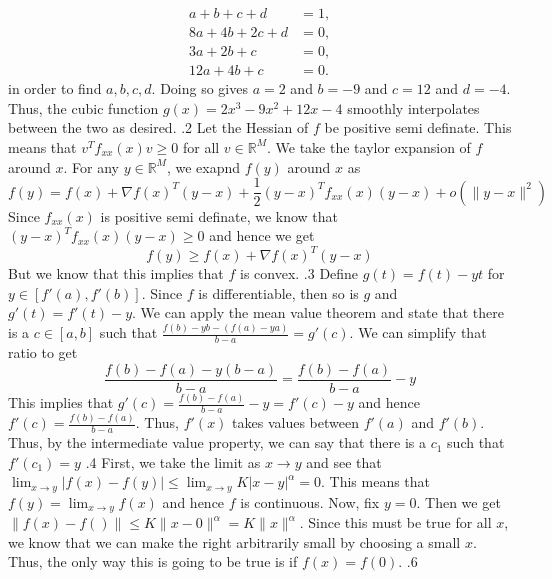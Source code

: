 \documentclass[12pt]{exam}
\begin{document}
\begin{questions}
\[\begin{aligned}
a + b + c + d &= 1, \\
8a + 4b + 2c + d &= 0, \\
3a + 2b + c &= 0, \\
12a + 4b + c &= 0.
\end{aligned}
\]
in order to find $a,b,c,d$. Doing so gives $a = 2$ and $b = -9$ and $c = 12$ and $d = -4$. Thus, the cubic function $g(x) = 2x^3-9x^2+12x-4$ smoothly interpolates between the two as desired. 
.2 \newline
Let the Hessian of $f$ be positive semi definate. This means that $v^Tf_{xx}(x)v \geq 0$ for all $v\in \mathbb{R}^M$. We take the taylor expansion of $f$ around $x$. For any $y\in \mathbb{R}^M$, we exapnd $f(y)$ around $x$ as \[
f(y)=f(x)+\nabla f(x)^T(y-x)+\frac12(y-x)^Tf_{xx}(x)(y-x)+o(\|y-x\|^2)\]
Since $f_{xx}(x)$ is positive semi definate, we know that $(y-x)^Tf_{xx}(x)(y-x) \geq 0$ and hence we get \[f(y)\geq f(x)+\nabla f(x)^T(y-x)\] But we know that this implies that $f$ is convex. 
.3\newline
Define $g(t) = f(t)-yt$ for $y \in [f'(a), f'(b)]$. Since $f$ is differentiable, then so is $g$ and $g'(t) = f'(t)-y$. We can apply the mean value theorem and state that there is a $c\in [a,b]$ such that $\frac{f(b)-yb-(f(a)-ya)}{b-a} = g'(c)$. We can simplify that ratio to get \[\frac{f(b)-f(a)-y(b-a)}{b-a} = \frac{f(b)-f(a)}{b-a}-y\]
This implies that $g'(c) = \frac{f(b)-f(a)}{b-a}-y = f'(c)-y$ and hence $f'(c) = \frac{f(b)-f(a)}{b-a}$. Thus, $f'(x)$ takes values between $f'(a)$ and $f'(b)$. Thus, by the intermediate value property, we can say that there is a $c_1$ such that $f'(c_1) = y$ 
.4\newline
First, we take the limit as $x\to y$ and see that $\lim_{x\to y}|f(x)-f(y)|\leq\lim_{x\to y}K|x-y|^\alpha=0$. This means that $f(y)=\lim_{x\to y}f(x)$ and hence $f$ is continuous. Now, fix $y=0$. Then we get $\|f(x)-f()\|\leq K\|x-0\|^\alpha=K\|x\|^\alpha$. Since this must be true for all $x$, we know that we can make the right arbitrarily small by choosing a small $x$. Thus, the only way this is going to be true is if $f(x)=f(0)$. 
.6
\end{questions}
\end{document}

